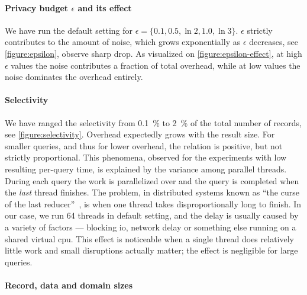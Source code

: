 			\paragraph*{Privacy budget \texorpdfstring{$\epsilon$}{epsilon} and its effect}

				We have run the default setting for $\epsilon = \{ 0.1, \allowbreak 0.5, \allowbreak \ln{2}, \allowbreak 1.0, \allowbreak \ln{3} \}$.
				$\epsilon$ strictly contributes to the amount of noise, which grows exponentially as $\epsilon$ decreases, see \cref{figure:epsilon}, observe sharp drop.
				As visualized on \cref{figure:epsilon-effect}, at high $\epsilon$ values the noise contributes a fraction of total overhead, while at low values the noise dominates the overhead entirely.

			

			\paragraph*{Selectivity}

				We have ranged the selectivity from \SI{0.1}{\percent} to \SI{2}{\percent} of the total number of records, see \cref{figure:selectivity}.
				Overhead expectedly grows with the result size.
				For smaller queries, and thus for lower overhead, the relation is positive, but not strictly proportional.
				This phenomena, observed for the experiments with low resulting per-query time, is explained by the variance among parallel threads.
				During each query the work is parallelized over \oramsNumber{}  and the query is completed when the \emph{last} thread finishes.
				The problem, in distributed systems known as ``the curse of the last reducer''~\cite{curse-of-last-reducer}, is when one thread takes disproportionally long to finish.
				In our case, we run 64 threads in default setting, and the delay is usually caused by a variety of factors --- blocking \acrshort{io}, network delay or something else running on a shared virtual \acrshort{cpu}.
				This effect is noticeable when a single thread does relatively little work and small disruptions actually matter; the effect is negligible for large queries.

			

			\paragraph*{Record, data and domain sizes}

